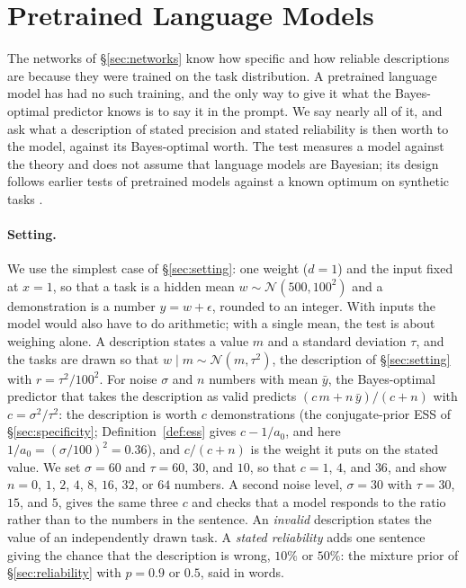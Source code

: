 \documentclass{article}
\begin{document}
\section{Pretrained Language Models}\label{sec:llm}
The networks of \S\ref{sec:networks} know how specific and how reliable descriptions are because they were trained on the task distribution. A pretrained language model has had no such training, and the only way to give it what the Bayes-optimal predictor knows is to say it in the prompt. We say nearly all of it, and ask what a description of stated precision and stated reliability is then worth to the model, against its Bayes-optimal worth. The test measures a model against the theory and does not assume that language models are Bayesian; its design follows earlier tests of pretrained models against a known optimum on synthetic tasks \citep{gupta2025, akata2026}.

\paragraph{Setting.} We use the simplest case of \S\ref{sec:setting}: one weight ($d = 1$) and the input fixed at $x = 1$, so that a task is a hidden mean $w \sim \mathcal{N}(500, 100^2)$ and a demonstration is a number $y = w + \epsilon$, rounded to an integer. With inputs the model would also have to do arithmetic; with a single mean, the test is about weighing alone. A description states a value $m$ and a standard deviation $\tau$, and the tasks are drawn so that $w \mid m \sim \mathcal{N}(m, \tau^2)$, the description of \S\ref{sec:setting} with $r = \tau^2 / 100^2$. For noise $\sigma$ and $n$ numbers with mean $\bar y$, the Bayes-optimal predictor that takes the description as valid predicts $(c\,m + n\,\bar y)/(c + n)$ with $c = \sigma^2 / \tau^2$: the description is worth $c$ demonstrations (the conjugate-prior ESS of \S\ref{sec:specificity}; Definition~\ref{def:ess} gives $c - 1/a_0$, and here $1/a_0 = (\sigma/100)^2 = 0.36$), and $c/(c+n)$ is the weight it puts on the stated value. We set $\sigma = 60$ and $\tau = 60$, $30$, and $10$, so that $c = 1$, $4$, and $36$, and show $n = 0$, $1$, $2$, $4$, $8$, $16$, $32$, or $64$ numbers. A second noise level, $\sigma = 30$ with $\tau = 30$, $15$, and $5$, gives the same three $c$ and checks that a model responds to the ratio rather than to the numbers in the sentence. An \emph{invalid} description states the value of an independently drawn task. A \emph{stated reliability} adds one sentence giving the chance that the description is wrong, $10\%$ or $50\%$: the mixture prior of \S\ref{sec:reliability} with $p = 0.9$ or $0.5$, said in words.
\end{document}
